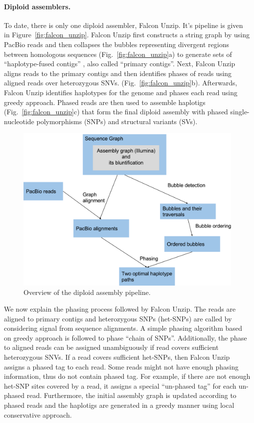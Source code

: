 \paragraph{Diploid assemblers.}
To date, there is only one diploid assembler, Falcon Unzip. It's pipeline is given in Figure~\ref{fig:falcon_unzip}.
Falcon Unzip first constructs a string graph by using PacBio reads and then collapses the bubbles representing divergent regions between homologous sequences (Fig.~\ref{fig:falcon_unzip}a) to generate sets of ``haplotype-fused contigs'' , also called ``primary contigs''. 
Next, Falcon Unzip aligns reads to the primary contigs and then identifies phases of reads using aligned reads over heterozygous SNVs. (Fig.~\ref{fig:falcon_unzip}b). 
Afterwards, Falcon Unzip identifies haplotypes for the genome and phases each read using greedy approach.
Phased reads are then used to assemble haplotigs (Fig.~\ref{fig:falcon_unzip}c) 
that form the final diploid assembly with phased single-nucleotide polymorphisms (SNPs) and structural variants (SVs).
\begin{figure}[t!]\centering
\includegraphics[width=.8\columnwidth]{pipeline.pdf}
\caption{Overview of the diploid assembly pipeline. }
\label{fig:pipeline}
\end{figure}

We now explain the phasing process followed by Falcon Unzip.
The reads are aligned to primary contigs and heterozygous SNPs (het-SNPs) are called by considering signal from sequence alignments.
A simple phasing algorithm based on greedy approach is followed to phase ``chain of SNPs''. 
Additionally, the phase to aligned reads can be assigned unambiguously if read covers sufficient heterozygous SNVs.
If a read covers sufficient het-SNPs, then Falcon Unzip assigns a phased tag to each read.
Some reads might not have enough phasing information, thus do not contain phased tag.
For example, if there are not enough het-SNP sites covered by a read, it assigns a special ``un-phased tag'' for each un-phased read.
Furthermore, the initial assembly graph is updated according to phased reads and the haplotigs are generated in a greedy manner using local conservative approach.


